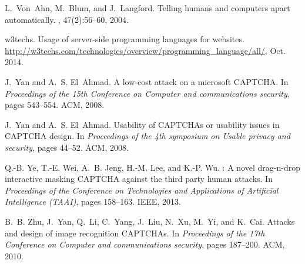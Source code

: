 \documentclass[conference]{IEEEtran}
\begin{document}
\begin{thebibliography}{10}
L.~Von~Ahn, M.~Blum, and J.~Langford.
\newblock Telling humans and computers apart automatically.
, 47(2):56--60, 2004.

w3techs.
\newblock Usage of server-side programming languages for websites.
\newblock
  \url{http://w3techs.com/technologies/overview/programming_language/all/},
  Oct. 2014.

J.~Yan and A.~S. El~Ahmad.
\newblock A low-cost attack on a microsoft {CAPTCHA}.
\newblock In {\em Proceedings of the 15th Conference on Computer and
  communications security}, pages 543--554. ACM, 2008.

J.~Yan and A.~S. El~Ahmad.
\newblock Usability of {CAPTCHA}s or usability issues in {CAPTCHA} design.
\newblock In {\em Proceedings of the 4th symposium on Usable privacy and
  security}, pages 44--52. ACM, 2008.

Q.-B. Ye, T.-E. Wei, A.~B. Jeng, H.-M. Lee, and K.-P. Wu.
: A novel drag-n-drop interactive masking {CAPTCHA}
  against the third party human attacks.
\newblock In {\em Proceedings of the Conference on Technologies and
  Applications of Artificial Intelligence (TAAI)}, pages 158--163. IEEE, 2013.

B.~B. Zhu, J.~Yan, Q.~Li, C.~Yang, J.~Liu, N.~Xu, M.~Yi, and K.~Cai.
\newblock Attacks and design of image recognition {CAPTCHA}s.
\newblock In {\em Proceedings of the 17th Conference on Computer and
  communications security}, pages 187--200. ACM, 2010.

\end{thebibliography}
\end{document}
